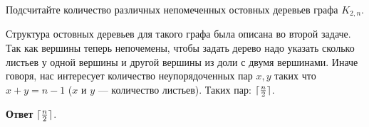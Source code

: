 \documentclass[a4paper,12pt,twoside]{article}
\begin{document}
\begin{?}
    Подсчитайте количество различных непомеченных остовных деревьев графа $K_{2,n}$.
\end{?}
\begin{solution}{}
    Структура остовных деревьев для такого графа была описана во второй задаче. Так как вершины теперь непочемены, чтобы задать дерево надо указать сколько листьев у одной вершины и другой вершины из доли с двумя вершинами. Иначе говоря, нас интересует количество неупорядоченных пар $x, y$ таких что $x + y = n - 1$ ($x$ и $y$ --- количество листьев). Таких пар: $\lceil\frac{n}{2}\rceil$. 

    \noindent\textbf{Ответ} $\lceil\frac{n}{2}\rceil$.
\end{solution}
\end{document}
